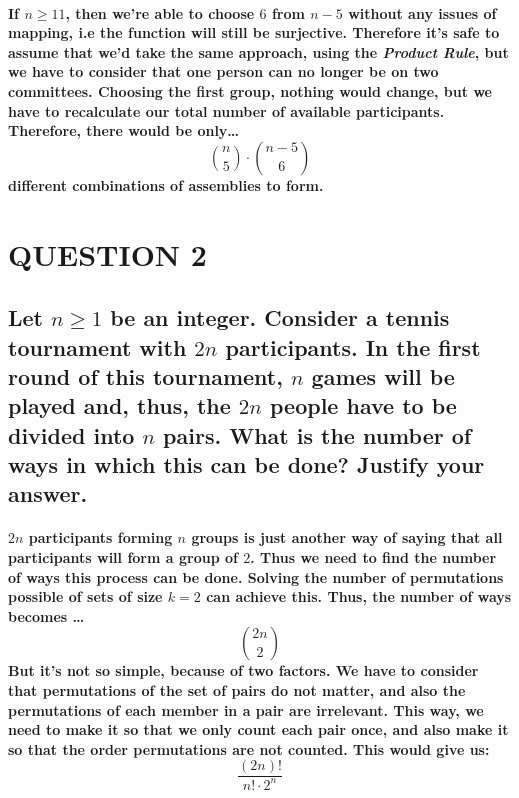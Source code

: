 \documentclass{amsart}
\theoremstyle{definition}
\theoremstyle{remark}
\numberwithin{equation}{section}
\begin{document}
\paragraph{\newline
	If $n \geq 11$, then we're able to choose $6$ from $n-5$ without any issues of mapping, i.e the function will still be surjective. Therefore it's safe to assume that we'd take the same approach, using the \textit{Product Rule}, but we have to consider that one person can no longer be on two committees. Choosing the first group, nothing would change, but we have to recalculate our total number of \textbf{available} participants. Therefore, there would be only\dots\newline
	$${n \choose 5} \cdot {n-5 \choose 6}$$\newline
different combinations of assemblies to form.
}



\section*{QUESTION 2}
\subsection*{
Let $n \geq 1$ be an integer. Consider a tennis tournament with $2n$ 
participants. In the first round of this tournament, $n$ games will be 
played and, thus, the $2n$ people have to be divided into $n$ pairs.  
What is the number of ways in which this can be done? 
Justify your answer. 
}

\paragraph{
\newline
$2n$ participants forming $n$ groups is just another way of saying that all participants will form a group of $2$. Thus we need to find the number of ways this process can be done. Solving the number of permutations possible of sets of size $k=2$ can achieve this. Thus, the number of ways becomes \dots$${2n \choose 2}$$\newline
But it's not so simple, because of two factors. We have to consider that \textbf{permutations of the set of pairs} do not matter, and also the \textbf{permutations of each member in a pair} are irrelevant. This way, we need to make it so that we only count each pair \textbf{once}, and also make it so that the order permutations are not counted. This would give us: $$\frac{(2n)!}{ n! \cdot 2^{n}}$$
}
\end{document}
